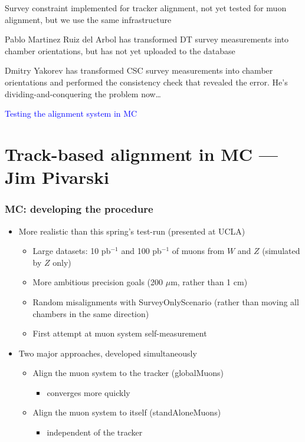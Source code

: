 \documentclass[compress]{beamer}
\begin{document}
\begin{notes}
\item Survey constraint implemented for tracker alignment, not yet tested for muon alignment, but we use the same infrastructure
\item Pablo Martinez Ruiz del Arbol has transformed DT survey measurements into chamber orientations, but has not yet uploaded to the database
\item Dmitry Yakorev has transformed CSC survey measurements into
chamber orientations and performed the consistency check that revealed
the error.  He's dividing-and-conquering the problem now\ldots
\end{notes}

\begin{frame}
\begin{center}
\huge \textcolor{blue}{Testing the alignment system in MC}
\end{center}
\end{frame}

\section*{Track-based alignment in MC --- Jim Pivarski}

\begin{frame}
\frametitle{MC: developing the procedure}
\begin{itemize}\setlength{\itemsep}{0.25 cm}
\item More realistic than this spring's test-run (presented at UCLA)

\begin{itemize}\setlength{\itemsep}{0.25 cm}
\item Large datasets: 10 pb$^{-1}$ and 100 pb$^{-1}$ of muons from $W$ and $Z$ (simulated by $Z$ only)
\item More ambitious precision goals (200 $\mu$m, rather than 1 cm)
\item Random misalignments with SurveyOnlyScenario (rather than moving all chambers in the same direction)
\item First attempt at muon system self-measurement
\end{itemize}

\item Two major approaches, developed simultaneously

\begin{itemize}\setlength{\itemsep}{0.25 cm}
\item Align the muon system to the tracker (globalMuons)
\begin{itemize}
\item converges more quickly
\end{itemize}

\item Align the muon system to itself (standAloneMuons)
\begin{itemize}
\item independent of the tracker
\end{itemize}
\end{itemize}
\end{itemize}
\end{frame}
\end{document}
